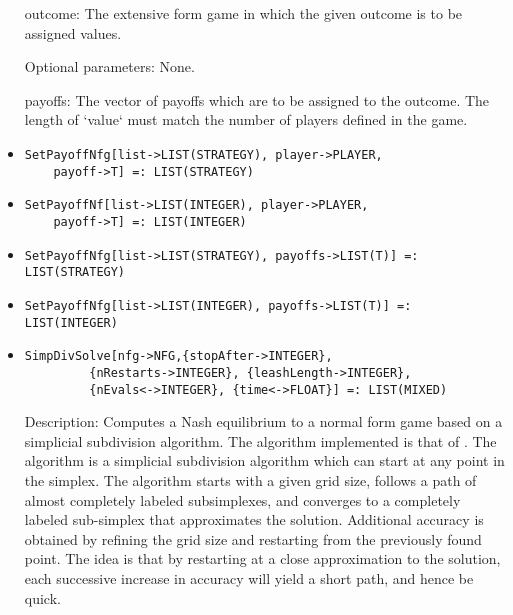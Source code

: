 \begin{itemize}
\bd
\item
[outcome:] The extensive form game in which the given outcome is to be
assigned values.
\ed

\item
[Optional parameters:] None.
\bd
\item
[payoffs:] The vector of payoffs which are to be assigned to the
outcome.  The length of `value` must match the number of players
defined in the game.
\ed
\ed

\item
\protect \large \begin{verbatim}
SetPayoffNfg[list->LIST(STRATEGY), player->PLAYER, 
	payoff->T] =: LIST(STRATEGY)
\end{verbatim}\normalsize

\item
\protect \large \begin{verbatim}
SetPayoffNf[list->LIST(INTEGER), player->PLAYER, 
	payoff->T] =: LIST(INTEGER)
\end{verbatim}\normalsize

\item
\protect \large \begin{verbatim}
SetPayoffNfg[list->LIST(STRATEGY), payoffs->LIST(T)] =: LIST(STRATEGY)
\end{verbatim}\normalsize

\item
\protect \large \begin{verbatim}
SetPayoffNfg[list->LIST(INTEGER), payoffs->LIST(T)] =: LIST(INTEGER)
\end{verbatim}\normalsize



\item
\protect \large \begin{verbatim}
SimpDivSolve[nfg->NFG,{stopAfter->INTEGER}, 
         {nRestarts->INTEGER}, {leashLength->INTEGER},
         {nEvals<->INTEGER}, {time<->FLOAT}] =: LIST(MIXED)
\end{verbatim}\normalsize

\bd
\item
[Description:] Computes a Nash equilibrium to a normal form game based
on a simplicial subdivision algorithm.  The algorithm implemented is
that of \cite{VTH:1987}.  The 
algorithm is a simplicial subdivision algorithm which can start at any
point in the simplex.  The algorithm starts with a given grid size,
follows a path of almost completely labeled subsimplexes, and
converges to a completely labeled sub-simplex that approximates the
solution.  Additional accuracy is obtained by refining the grid size
and restarting from the previously found point.  The idea is that by
restarting at a close approximation to the solution, each successive
increase in accuracy will yield a short path, and hence be quick.


\end{itemize}
